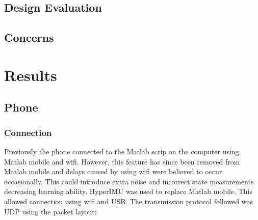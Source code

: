 \documentclass[twoside,twocolumn,12pt]{article}
\begin{document}
\subsection{Design Evaluation}


\subsection{Concerns}

\clearpage
\section{Results}
\subsection{Phone}
\subsubsection{Connection}
Previously the phone connected to the Matlab scrip on the computer using Matlab mobile and wifi. However, this feature has since been removed from Matlab mobile and delays caused by using wifi were believed to occur occasionally. This could introduce extra noise and incorrect state measurements decreasing learning ability.
\newline
HyperIMU \cite{ianovir} was used to replace Matlab mobile. This allowed connection using wifi and USB. The transmission protocol followed was UDP using the packet layout:
\end{document}
